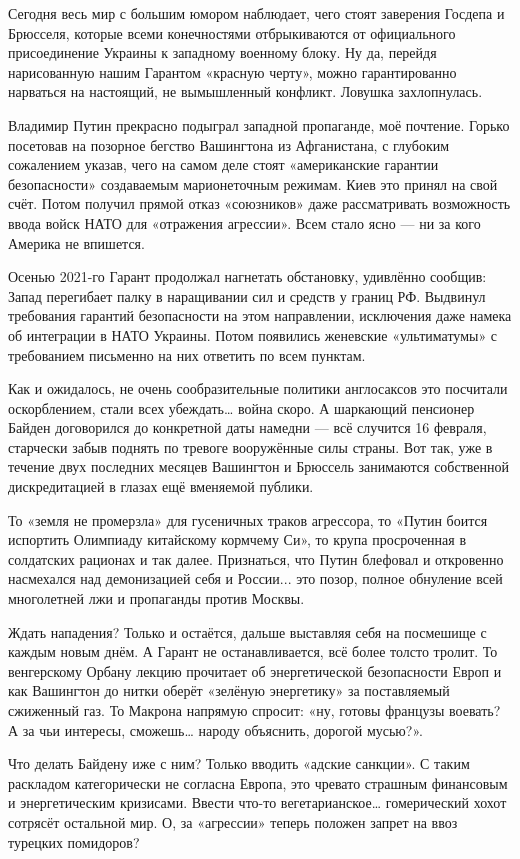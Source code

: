 Сегодня весь мир с большим юмором наблюдает, чего стоят заверения Госдепа и
Брюсселя, которые всеми конечностями отбрыкиваются от официального
присоединение Украины к западному военному блоку. Ну да, перейдя нарисованную
нашим Гарантом «красную черту», можно гарантированно нарваться на настоящий, не
вымышленный конфликт. Ловушка захлопнулась.

Владимир Путин прекрасно подыграл западной пропаганде, моё почтение. Горько
посетовав на позорное бегство Вашингтона из Афганистана, с глубоким сожалением
указав, чего на самом деле стоят «американские гарантии безопасности»
создаваемым марионеточным режимам. Киев это принял на свой счёт. Потом получил
прямой отказ «союзников» даже рассматривать возможность ввода войск НАТО для
«отражения агрессии». Всем стало ясно — ни за кого Америка не впишется.

Осенью 2021-го Гарант продолжал нагнетать обстановку, удивлённо сообщив: Запад
перегибает палку в наращивании сил и средств у границ РФ. Выдвинул требования
гарантий безопасности на этом направлении, исключения даже намека об интеграции
в НАТО Украины. Потом появились женевские «ультиматумы» с требованием письменно
на них ответить по всем пунктам.

Как и ожидалось, не очень сообразительные политики англосаксов это посчитали
оскорблением, стали всех убеждать… война скоро. А шаркающий пенсионер Байден
договорился до конкретной даты намедни — всё случится 16 февраля, старчески
забыв поднять по тревоге вооружённые силы страны. Вот так, уже в течение двух
последних месяцев Вашингтон и Брюссель занимаются собственной дискредитацией в
глазах ещё вменяемой публики.

То «земля не промерзла» для гусеничных траков агрессора, то «Путин боится
испортить Олимпиаду китайскому кормчему Си», то крупа просроченная в солдатских
рационах и так далее. Признаться, что Путин блефовал и откровенно насмехался
над демонизацией себя и России... это позор, полное обнуление всей многолетней
лжи и пропаганды против Москвы.

Ждать нападения? Только и остаётся, дальше выставляя себя на посмешище с каждым
новым днём. А Гарант не останавливается, всё более толсто тролит. То
венгерскому Орбану лекцию прочитает об энергетической безопасности Европ и как
Вашингтон до нитки оберёт «зелёную энергетику» за поставляемый сжиженный газ.
То Макрона напрямую спросит: «ну, готовы французы воевать? А за чьи интересы,
сможешь… народу объяснить, дорогой мусью?».

Что делать Байдену иже с ним? Только вводить «адские санкции». С таким
раскладом категорически не согласна Европа, это чревато страшным финансовым и
энергетическим кризисами. Ввести что-то вегетарианское… гомерический хохот
сотрясёт остальной мир. О, за «агрессии» теперь положен запрет на ввоз турецких
помидоров?

